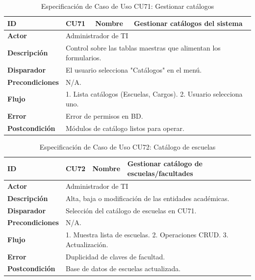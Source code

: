 \begin{table}[ht!]
    \centering
    \caption{Especificación de Caso de Uso CU71: Gestionar catálogos}
    \label{tab:cu71}
    \begin{tabularx}{\textwidth}{|l|p{2cm}|l|X|}
        \hline
        \textbf{ID} & CU71 & \textbf{Nombre} & Gestionar catálogos del sistema \\ \hline
        \textbf{Actor} & \multicolumn{3}{X|}{Administrador de TI} \\ \hline
        \textbf{Descripción} & \multicolumn{3}{X|}{Control sobre las tablas maestras que alimentan los formularios.} \\ \hline
        \textbf{Disparador} & \multicolumn{3}{X|}{El usuario selecciona "Catálogos" en el menú.} \\ \hline
        \textbf{Precondiciones} & \multicolumn{3}{X|}{N/A.} \\ \hline
        \textbf{Flujo} & \multicolumn{3}{X|}{1. Lista catálogos (Escuelas, Cargos). 2. Usuario selecciona uno.} \\ \hline
        \textbf{Error} & \multicolumn{3}{X|}{Error de permisos en BD.} \\ \hline
        \textbf{Postcondición} & \multicolumn{3}{X|}{Módulos de catálogo listos para operar.} \\ \hline
    \end{tabularx}
\end{table}

\vspace{-0.4cm}

\begin{table}[ht!]
    \centering
    \caption{Especificación de Caso de Uso CU72: Catálogo de escuelas}
    \label{tab:cu72}
    \begin{tabularx}{\textwidth}{|l|p{2cm}|l|X|}
        \hline
        \textbf{ID} & CU72 & \textbf{Nombre} & Gestionar catálogo de escuelas/facultades \\ \hline
        \textbf{Actor} & \multicolumn{3}{X|}{Administrador de TI} \\ \hline
        \textbf{Descripción} & \multicolumn{3}{X|}{Alta, baja o modificación de las entidades académicas.} \\ \hline
        \textbf{Disparador} & \multicolumn{3}{X|}{Selección del catálogo de escuelas en CU71.} \\ \hline
        \textbf{Precondiciones} & \multicolumn{3}{X|}{N/A.} \\ \hline
        \textbf{Flujo} & \multicolumn{3}{X|}{1. Muestra lista de escuelas. 2. Operaciones CRUD. 3. Actualización.} \\ \hline
        \textbf{Error} & \multicolumn{3}{X|}{Duplicidad de claves de facultad.} \\ \hline
        \textbf{Postcondición} & \multicolumn{3}{X|}{Base de datos de escuelas actualizada.} \\ \hline
    \end{tabularx}
\end{table}

